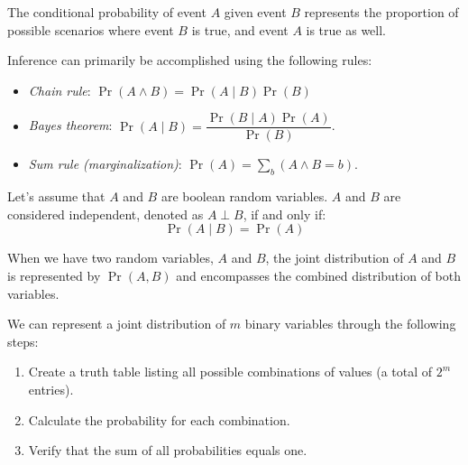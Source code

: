\begin{definition}
    The conditional probability of event $A$ given event $B$ represents the proportion of possible scenarios where event $B$ is true, and event $A$ is true as well.
\end{definition}
Inference can primarily be accomplished using the following rules:
\begin{itemize}
    \item \textit{Chain rule}: $\Pr(A \land B)=\Pr(A\mid B)\Pr(B)$
    \item \textit{Bayes theorem}: $\Pr(A\mid B)=\dfrac{\Pr(B\mid A)\Pr(A)}{\Pr(B)}$.
    \item \textit{Sum rule (marginalization)}: $\Pr(A)=\sum_{b}{(A \land B=b)}$.
\end{itemize}
\begin{definition}
    Let's assume that $A$ and $B$ are boolean random variables. $A$ and $B$ are considered independent, denoted as $A \perp B$, if and only if:
    \[\Pr(A\mid B)=\Pr(A)\]
\end{definition}
\begin{definition}
    When we have two random variables, $A$ and $B$, the joint distribution of $A$ and $B$ is represented by $\Pr(A, B)$ and encompasses the combined distribution of both variables.    
\end{definition}
We can represent a joint distribution of $m$ binary variables through the following steps:
\begin{enumerate}
    \item Create a truth table listing all possible combinations of values (a total of $2^m$ entries).
    \item Calculate the probability for each combination.
    \item Verify that the sum of all probabilities equals one.
\end{enumerate}